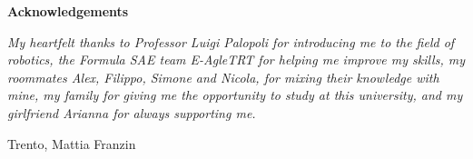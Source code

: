 \thispagestyle{empty}

\begin{center}
  {\bf \Huge Acknowledgements}
\end{center}

\vspace{4cm}

\noindent\emph{
My heartfelt thanks to Professor Luigi Palopoli for introducing me to the field of robotics, the Formula SAE team E-AgleTRT for helping me improve my skills, my roommates Alex, Filippo, Simone and Nicola, for mixing their knowledge with mine, my family for giving me the opportunity to study at this university, and my girlfriend Arianna for always supporting me.
}

\bigskip

\noindent Trento, \makeatletter\@date\makeatother
\hfill
Mattia Franzin
